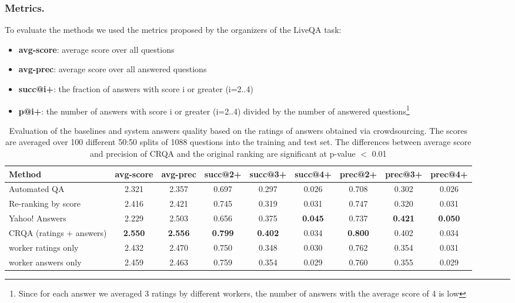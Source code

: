 \documentclass[letterpaper]{article}
\begin{document}
\subsubsection{Metrics.}
To evaluate the methods we used the metrics proposed by the organizers of the LiveQA task:
\begin{itemize}
\item \textbf{avg-score}: average score over all questions
\item \textbf{avg-prec}: average score over all answered questions
\item \textbf{succ@i+}: the fraction of answers with score i or greater (i=2..4)
\item \textbf{p@i+}: the number of answers with score i or greater (i=2..4) divided by the number of answered questions\footnote{Since for each answer we averaged 3 ratings by different workers, the number of answers with the average score of 4 is low}
\end{itemize}

\begin{table}[ht]
\centering
\begin{tabular}{| p{3.7cm} | c | c | c | c | c | c | c | c |}
\hline
Method & avg-score & avg-prec & succ@2+ & succ@3+ & succ@4+ & prec@2+ & prec@3+ & prec@4+ \\
\hline
Automated QA & 2.321 & 2.357 & 0.697 & 0.297 & 0.026 & 0.708 & 0.302 & 0.026 \\
Re-ranking by score & 2.416 & 2.421 & 0.745 & 0.319 & 0.031 & 0.747 & 0.320 & 0.031 \\
Yahoo! Answers & 2.229 & 2.503 & 0.656 & 0.375 & \textbf{0.045} & 0.737 & \textbf{0.421} & \textbf{0.050} \\
CRQA (ratings + answers) & \textbf{2.550} & \textbf{2.556} & \textbf{0.799} & \textbf{0.402} & 0.034 & \textbf{0.800} & 0.402 & 0.034 \\
\hspace{5mm}worker ratings only & 2.432 & 2.470 & 0.750 & 0.348 & 0.030 & 0.762 & 0.354 & 0.031 \\
\hspace{5mm}worker answers only & 2.459 & 2.463 & 0.759 & 0.354 & 0.029 & 0.760 & 0.355 & 0.029 \\
\hline
\end{tabular}
\caption{Evaluation of the baselines and system answers quality based on the ratings of answers obtained via crowdsourcing. The scores are averaged over 100 different 50:50 splits of 1088 questions into the training and test set. The differences between average score and precision of CRQA and the original ranking are significant at p-value $<$ 0.01}
\label{table:performance}
\end{table}
\end{document}
